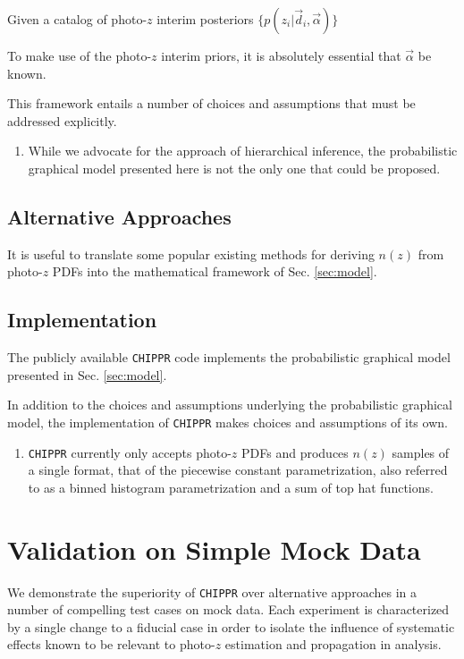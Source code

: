 \documentclass[iop]{emulateapj}
\newcommand{\chippr}{\texttt{CHIPPR} }
\begin{document}
Given a catalog of photo-$z$ interim posteriors $\{p(z_{i} | \vec{d}_{i}, \vec{\alpha})\}$

To make use of the photo-$z$ interim priors, it is absolutely essential that $\vec{\alpha}$ be known.  

This framework entails a number of choices and assumptions that must be addressed explicitly.

\begin{enumerate}
	\item While we advocate for the approach of hierarchical inference, the probabilistic graphical model presented here is not the only one that could be proposed.
\end{enumerate}

\subsection{Alternative Approaches}
\label{sec:others}

It is useful to translate some popular existing methods for deriving $n(z)$ from photo-$z$ PDFs into the mathematical framework of Sec. \ref{sec:model}.

\subsection{Implementation}
\label{sec:implementation}

The publicly available \chippr code implements the probabilistic graphical model presented in Sec. \ref{sec:model}.  

In addition to the choices and assumptions underlying the probabilistic graphical model, the implementation of \chippr makes choices and assumptions of its own.

\begin{enumerate}
	\item \chippr currently only accepts photo-$z$ PDFs and produces $n(z)$ samples of a single format, that of the piecewise constant parametrization, also referred to as a binned histogram parametrization and a sum of top hat functions.
\end{enumerate}

\section{Validation on Simple Mock Data}
\label{sec:validation}

We demonstrate the superiority of \chippr over alternative approaches in a number of compelling test cases on mock data.  Each experiment is characterized by a single change to a fiducial case in order to isolate the influence of systematic effects known to be relevant to photo-$z$ estimation and propagation in analysis.  
\end{document}
